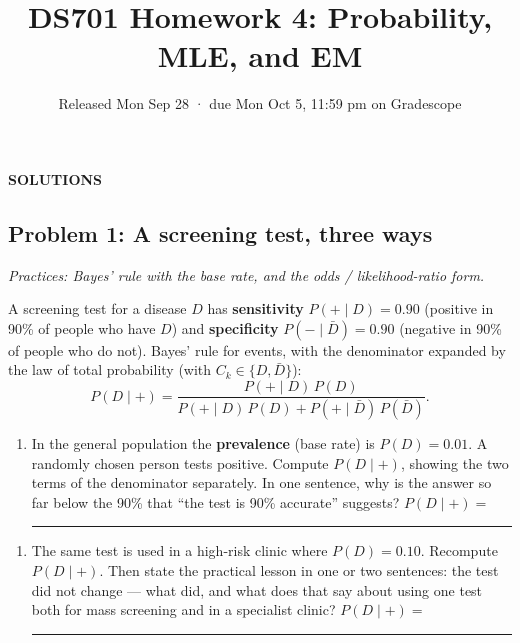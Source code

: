 \documentclass[
  11pt,
]{article}
\title{DS701 Homework 4: Probability, MLE, and EM}
\subtitle{Released Mon Sep 28 · due Mon Oct 5, 11:59 pm on Gradescope}
\author{}
\date{}
\providecommand{\tightlist}{%
  \setlength{\itemsep}{0pt}\setlength{\parskip}{0pt}}
\newcommand{\answerspace}[1]{\par\vspace*{#1}}  %
\newcommand{\blank}[1][1.2in]{\rule{#1}{0.4pt}}
\newcommand{\answerpage}{\clearpage}
\begin{document}
\maketitle


\begin{center}\LARGE\bfseries\color{blue!45!black} SOLUTIONS\end{center}
\renewcommand{\answerspace}[1]{}
\renewcommand{\answerpage}{\par\vspace{6pt}}

\subsection{Problem 1: A screening test, three
ways}\label{problem-1-a-screening-test-three-ways}

\emph{Practices: Bayes' rule with the base rate, and the odds /
likelihood-ratio form.}

A screening test for a disease \(D\) has \textbf{sensitivity}
\(P(+\mid D) = 0.90\) (positive in 90\% of people who have \(D\)) and
\textbf{specificity} \(P(-\mid \bar D) = 0.90\) (negative in 90\% of
people who do not). Bayes' rule for events, with the denominator
expanded by the law of total probability (with
\(C_k \in \{D, \bar D\}\)):
\[P(D\mid +) = \frac{P(+\mid D)\,P(D)}{P(+\mid D)\,P(D) + P(+\mid \bar D)\,P(\bar D)} .\]

\begin{enumerate}
\def\labelenumi{(\alph{enumi})}
\tightlist
\item
  In the general population the \textbf{prevalence} (base rate) is
  \(P(D) = 0.01\). A randomly chosen person tests positive. Compute
  \(P(D\mid +)\), showing the two terms of the denominator separately.
  In one sentence, why is the answer so far below the 90\% that ``the
  test is 90\% accurate'' suggests? \(P(D\mid +) =\) \blank[0.8in]
\end{enumerate}

\answerspace{2in}

\begin{enumerate}
\def\labelenumi{(\alph{enumi})}
\setcounter{enumi}{1}
\tightlist
\item
  The same test is used in a high-risk clinic where \(P(D) = 0.10\).
  Recompute \(P(D\mid +)\). Then state the practical lesson in one or
  two sentences: the test did not change --- what did, and what does
  that say about using one test both for mass screening and in a
  specialist clinic? \(P(D\mid +) =\) \blank[0.8in]
\end{enumerate}
\end{document}
